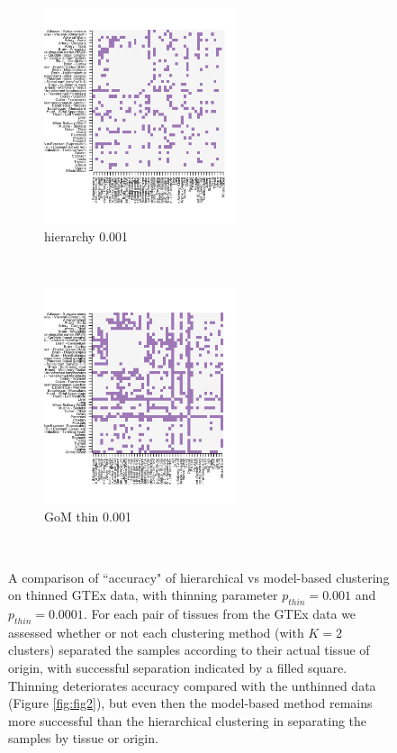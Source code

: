 \begin{figure}[ht]
     \begin{subfigure}[t]{0.5\textwidth}
        \centering
        \includegraphics[height=2.5in]{../plots/rsz_1hierarchy_F_thin_0_001.png}
        \caption{hierarchy 0.001}
    \end{subfigure}%
    ~
    \begin{subfigure}[t]{0.5\textwidth}
        \centering
        \includegraphics[height=2.5in]{../plots/rsz_1admixture_F_thin_0_001.png}
        \caption{GoM thin 0.001}
    \end{subfigure}\\

 \caption{A comparison of ``accuracy" of hierarchical vs model-based clustering on thinned GTEx data, with thinning parameter $p_{thin}=0.001$ and $p_{thin}=0.0001$.  For each pair of tissues from the GTEx data we assessed whether or not each clustering method (with $K=2$ clusters) separated the samples according to their actual tissue of origin, with successful separation indicated by a filled square. Thinning deteriorates accuracy compared with the unthinned data (Figure \ref{fig:fig2}), but even then the model-based method remains more successful than the hierarchical clustering in separating the samples by tissue or origin.}
 \label{fig:figS2}
\end{figure}

